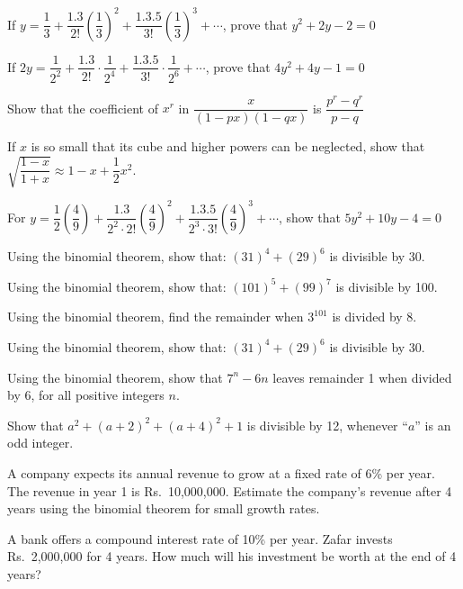 \documentclass[11pt,a4paper]{article}
\begin{document}
\begin{longlist}
\item If $y=\dfrac{1}{3}+\dfrac{1.3}{2!}\left(\dfrac{1}{3}\right)^2+\dfrac{1.3.5}{3!}\left(\dfrac{1}{3}\right)^3+\cdots$, prove that $y^2+2y-2=0$

\item If $2y=\dfrac{1}{2^2}+\dfrac{1.3}{2!}\cdot\dfrac{1}{2^4}+\dfrac{1.3.5}{3!}\cdot\dfrac{1}{2^6}+\cdots$, prove that $4y^2+4y-1=0$

\item Show that the coefficient of $x^r$ in $\dfrac{x}{(1-px)(1-qx)}$ is $\dfrac{p^r-q^r}{p-q}$

\item If $x$ is so small that its cube and higher powers can be neglected, show that $\sqrt{\dfrac{1-x}{1+x}}\approx 1-x+\dfrac{1}{2}x^2$.

\item For $y=\dfrac{1}{2}\left(\dfrac{4}{9}\right)+\dfrac{1.3}{2^2\cdot 2!}\left(\dfrac{4}{9}\right)^2+\dfrac{1.3.5}{2^3\cdot 3!}\left(\dfrac{4}{9}\right)^3+\cdots$, show that $5y^2+10y-4=0$

\item Using the binomial theorem, show that: $(31)^4+(29)^6$ is divisible by 30.

\item Using the binomial theorem, show that: $(101)^5+(99)^7$ is divisible by 100.

\item Using the binomial theorem, find the remainder when $3^{101}$ is divided by 8.

\item Using the binomial theorem, show that: $(31)^4+(29)^6$ is divisible by 30.

\item Using the binomial theorem, show that $7^n-6n$ leaves remainder 1 when divided by 6, for all positive integers $n$.

\item Show that $a^2+(a+2)^2+(a+4)^2+1$ is divisible by 12, whenever ``$a$'' is an odd integer.

\item A company expects its annual revenue to grow at a fixed rate of 6\% per year. The revenue in year 1 is Rs.\ 10,000,000. Estimate the company's revenue after 4 years using the binomial theorem for small growth rates.

\item A bank offers a compound interest rate of 10\% per year. Zafar invests Rs.\ 2,000,000 for 4 years. How much will his investment be worth at the end of 4 years?


\end{longlist}
\end{document}
